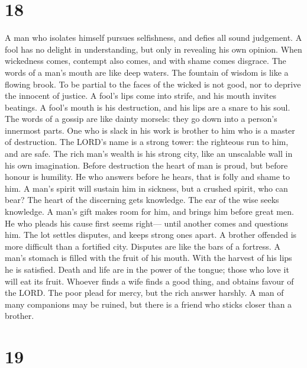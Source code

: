 \hypertarget{section-17}{%
\section{18}\label{section-17}}

 A man who isolates himself pursues selfishness, and
defies all sound judgement.  A fool has no delight in
understanding, but only in revealing his own opinion. 
When wickedness comes, contempt also comes, and with shame comes
disgrace.  The words of a man's mouth are like deep
waters. The fountain of wisdom is like a flowing brook. 
To be partial to the faces of the wicked is not good, nor to deprive the
innocent of justice.  A fool's lips come into strife, and
his mouth invites beatings.  A fool's mouth is his
destruction, and his lips are a snare to his soul.  The
words of a gossip are like dainty morsels: they go down into a person's
innermost parts.  One who is slack in his work is brother
to him who is a master of destruction.  The LORD's name
is a strong tower: the righteous run to him, and are safe.
 The rich man's wealth is his strong city, like an
unscalable wall in his own imagination.  Before
destruction the heart of man is proud, but before honour is humility.
 He who answers before he hears, that is folly and shame
to him.  A man's spirit will sustain him in sickness, but
a crushed spirit, who can bear?  The heart of the
discerning gets knowledge. The ear of the wise seeks knowledge.
 A man's gift makes room for him, and brings him before
great men.  He who pleads his cause first seems right---
until another comes and questions him.  The lot settles
disputes, and keeps strong ones apart.  A brother
offended is more difficult than a fortified city. Disputes are like the
bars of a fortress.  A man's stomach is filled with the
fruit of his mouth. With the harvest of his lips he is satisfied.
 Death and life are in the power of the tongue; those who
love it will eat its fruit.  Whoever finds a wife finds a
good thing, and obtains favour of the LORD.  The poor
plead for mercy, but the rich answer harshly.  A man of
many companions may be ruined, but there is a friend who sticks closer
than a brother.

\hypertarget{section-18}{%
\section{19}\label{section-18}}

